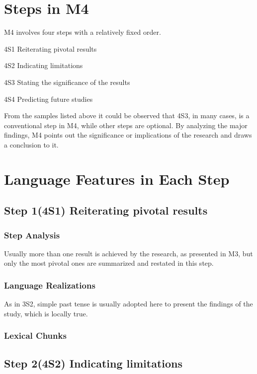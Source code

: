 \documentclass{ctexbook}
\begin{document}
\section{Steps in M4}

M4 involves four steps with a relatively fixed order.

4S1 Reiterating pivotal results

4S2 Indicating limitations

4S3 Stating the significance of the results

4S4 Predicting future studies

From the samples listed above it could be observed that 4S3, in many cases, is a conventional step in M4, while other steps are optional. By analyzing the major findings, M4 points out the significance or implications of the research and draws a conclusion to it.

\section{Language Features in Each Step}
  \subsection{Step 1(4S1) Reiterating pivotal results}
    \subsubsection{Step Analysis}

    Usually more than one result is achieved by the research, as presented in M3, but only the most pivotal ones are summarized and restated in this step.

    \subsubsection{Language Realizations}

    As in 3S2, simple past tense is usually adopted here to present the findings of the study, which is locally true.

    \subsubsection{Lexical Chunks}

  \subsection{Step 2(4S2) Indicating limitations}
\end{document}
